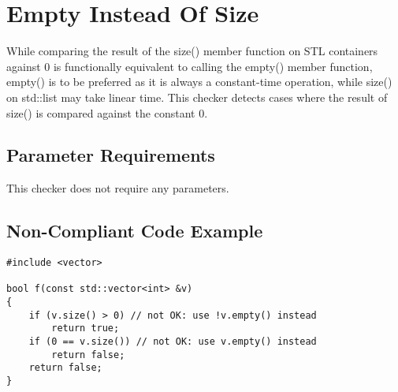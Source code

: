 %
%

\section{Empty Instead Of Size}
\label{EmptyInsteadOfSize::overview}

While comparing the result of the size() member function on STL containers
against 0 is functionally equivalent to calling the empty() member function,
empty() is to be preferred as it is always a constant-time operation, while
size() on std::list may take linear time. This checker detects cases where the
result of size() is compared against the constant 0.

\subsection{Parameter Requirements}

This checker does not require any parameters.

\subsection{Non-Compliant Code Example}

\begin{verbatim}
#include <vector>

bool f(const std::vector<int> &v)
{
    if (v.size() > 0) // not OK: use !v.empty() instead
        return true;
    if (0 == v.size()) // not OK: use v.empty() instead
        return false;
    return false;
}
\end{verbatim}

